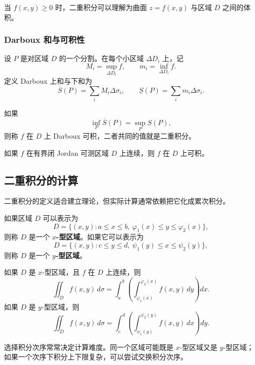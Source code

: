当 $f(x,y)\geq0$ 时，二重积分可以理解为曲面 $z=f(x,y)$ 与区域 $D$ 之间的体积。

\subsubsection{Darboux 和与可积性}

设 $P$ 是对区域 $D$ 的一个分割。在每个小区域 $\Delta D_i$ 上，记
\[
    M_i=\sup_{\Delta D_i}f,
    \qquad
    m_i=\inf_{\Delta D_i}f.
\]
定义 Darboux 上和与下和为
\[
    \overline{S}(P)=\sum_i M_i\Delta\sigma_i,
    \qquad
    \underline{S}(P)=\sum_i m_i\Delta\sigma_i.
\]

\begin{definition}[Darboux 可积]
如果
\[
    \inf_P\overline{S}(P)=\sup_P\underline{S}(P),
\]
则称 $f$ 在 $D$ 上 Darboux 可积，二者共同的值就是二重积分。
\end{definition}

\begin{theorem}[连续函数可积]
如果 $f$ 在有界闭 Jordan 可测区域 $D$ 上连续，则 $f$ 在 $D$ 上可积。
\end{theorem}

\subsection{二重积分的计算}

二重积分的定义适合建立理论，但实际计算通常依赖把它化成累次积分。

\begin{definition}
如果区域 $D$ 可以表示为
\[
    D=\{(x,y):a\leq x\leq b,\ \varphi_1(x)\leq y\leq\varphi_2(x)\},
\]
则称 $D$ 是一个 \textbf{$x$-型区域}。如果它可以表示为
\[
    D=\{(x,y):c\leq y\leq d,\ \psi_1(y)\leq x\leq\psi_2(y)\},
\]
则称 $D$ 是一个 \textbf{$y$-型区域}。
\end{definition}

\begin{theorem}[化为累次积分]
如果 $D$ 是 $x$-型区域，且 $f$ 在 $D$ 上连续，则
\[
    \iint_D f(x,y)\,d\sigma
    =\int_a^b\left(\int_{\varphi_1(x)}^{\varphi_2(x)}f(x,y)\,dy\right)dx.
\]
如果 $D$ 是 $y$-型区域，则
\[
    \iint_D f(x,y)\,d\sigma
    =\int_c^d\left(\int_{\psi_1(y)}^{\psi_2(y)}f(x,y)\,dx\right)dy.
\]
\end{theorem}

\begin{remark}
选择积分次序常常决定计算难度。同一个区域可能既是 $x$-型区域又是 $y$-型区域；如果一个次序下积分上下限复杂，可以尝试交换积分次序。
\end{remark}

